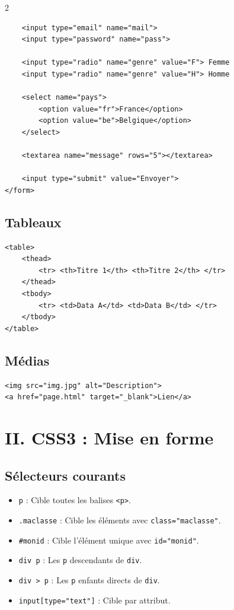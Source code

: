\documentclass[11pt,a4paper]{article}
\begin{document}
\begin{multicols*}{2}
\begin{lstlisting}
    <input type="email" name="mail">
    <input type="password" name="pass">

    <input type="radio" name="genre" value="F"> Femme
    <input type="radio" name="genre" value="H"> Homme
    
    <select name="pays">
        <option value="fr">France</option>
        <option value="be">Belgique</option>
    </select>

    <textarea name="message" rows="5"></textarea>

    <input type="submit" value="Envoyer">
</form>
\end{lstlisting}

\subsection{Tableaux}
\begin{lstlisting}
<table>
    <thead>
        <tr> <th>Titre 1</th> <th>Titre 2</th> </tr>
    </thead>
    <tbody>
        <tr> <td>Data A</td> <td>Data B</td> </tr>
    </tbody>
</table>
\end{lstlisting}

\subsection{Médias}
\begin{lstlisting}
<img src="img.jpg" alt="Description">
<a href="page.html" target="_blank">Lien</a>
\end{lstlisting}

\section{II. CSS3 : Mise en forme}

\subsection{Sélecteurs courants}
\begin{itemize}
    \item \texttt{p} : Cible toutes les balises \texttt{<p>}.
    \item \texttt{.maclasse} : Cible les éléments avec \texttt{class="maclasse"}.
    \item \texttt{\#monid} : Cible l'élément unique avec \texttt{id="monid"}.
    \item \texttt{div p} : Les \texttt{p} descendants de \texttt{div}.
    \item \texttt{div > p} : Les \texttt{p} enfants directs de \texttt{div}.
    \item \texttt{input[type="text"]} : Cible par attribut.
\end{itemize}


\end{multicols*}
\end{document}
